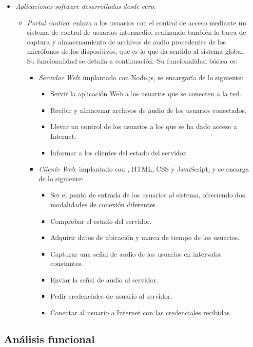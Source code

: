\begin{itemize}
\item \emph{Aplicaciones software desarrolladas desde cero}:
\begin{itemize}
\item \emph{Portal cautivo}: enlaza a los usuarios con el control de acceso mediante un sistema de control de usuarios intermedio, realizando también la tarea de captura y almacenamiento de archivos de audio procedentes de los micrófonos de los dispositivos, que es lo que da sentido al sistema global. Su funcionalidad se detalla a continuación. Su funcionalidad básica es:
\begin{itemize}
\item \emph{Servidor Web}: implantado con Node.js, se encargaría de lo siguiente:
\begin{itemize}
\item Servir la aplicación Web a los usuarios que se conecten a la red.
\item Recibir y almacenar archivos de audio de los usuarios conectados.
\item Llevar un control de los usuarios a los que se ha dado acceso a Internet.
\item Informar a los clientes del estado del servidor.
\end{itemize}
\item \emph{Cliente Web}: implantado con , HTML, CSS y JavaScript, y se encarga de lo siguiente:
\begin{itemize}
\item Ser el punto de entrada de los usuarios al sistema, ofreciendo dos modalidades de conexión diferentes.
\item Comprobar el estado del servidor.
\item Adquirir datos de ubicación y marca de tiempo de los usuarios.
\item Capturar una señal de audio de los usuarios en intervalos constantes.
\item Enviar la señal de audio al servidor.
\item Pedir credenciales de usuario al servidor.
\item Conectar al usuario a Internet con las credenciales recibidas. 
\end{itemize}
\end{itemize}
\end{itemize}
\end{itemize}

\subsection{Análisis funcional}

